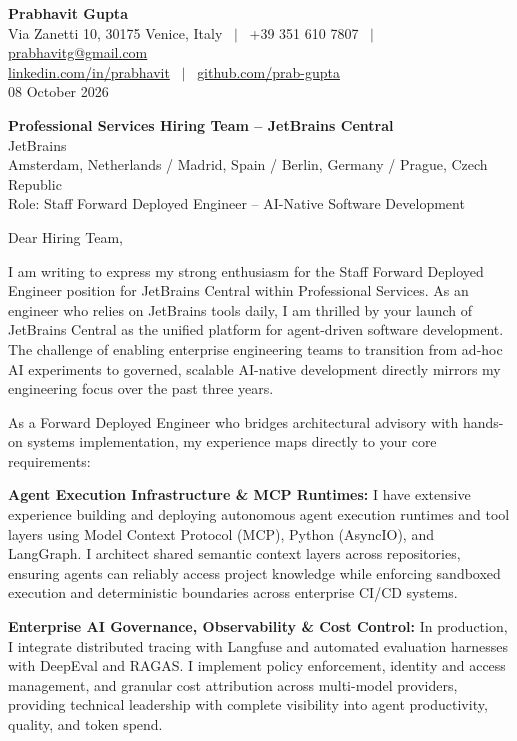 \documentclass[10.5pt,a4paper]{article}
\begin{document}
\textbf{\large Prabhavit Gupta}\\
Via Zanetti 10, 30175 Venice, Italy ~$\vert$~ +39 351 610 7807 ~$\vert$~ \href{mailto:prabhavitg@gmail.com}{prabhavitg@gmail.com}\\
\href{https://www.linkedin.com/in/prabhavit/}{linkedin.com/in/prabhavit} ~$\vert$~ \href{https://github.com/prab-gupta}{github.com/prab-gupta}\\
08 October 2026

\textbf{Professional Services Hiring Team -- JetBrains Central}\\
JetBrains\\
Amsterdam, Netherlands / Madrid, Spain / Berlin, Germany / Prague, Czech Republic\\
Role: Staff Forward Deployed Engineer -- AI-Native Software Development

Dear Hiring Team,

I am writing to express my strong enthusiasm for the Staff Forward Deployed Engineer position for JetBrains Central within Professional Services. As an engineer who relies on JetBrains tools daily, I am thrilled by your launch of JetBrains Central as the unified platform for agent-driven software development. The challenge of enabling enterprise engineering teams to transition from ad-hoc AI experiments to governed, scalable AI-native development directly mirrors my engineering focus over the past three years.

As a Forward Deployed Engineer who bridges architectural advisory with hands-on systems implementation, my experience maps directly to your core requirements:

\textbf{Agent Execution Infrastructure \& MCP Runtimes:} I have extensive experience building and deploying autonomous agent execution runtimes and tool layers using Model Context Protocol (MCP), Python (AsyncIO), and LangGraph. I architect shared semantic context layers across repositories, ensuring agents can reliably access project knowledge while enforcing sandboxed execution and deterministic boundaries across enterprise CI/CD systems.

\textbf{Enterprise AI Governance, Observability \& Cost Control:} In production, I integrate distributed tracing with Langfuse and automated evaluation harnesses with DeepEval and RAGAS. I implement policy enforcement, identity and access management, and granular cost attribution across multi-model providers, providing technical leadership with complete visibility into agent productivity, quality, and token spend.
\end{document}
